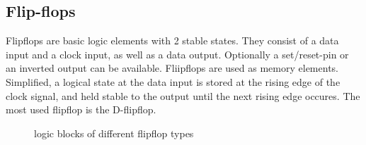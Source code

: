 \subsection{Flip-flops}
\label{ch:flipflops}
Flipflops are basic logic elements with 2 stable states. They consist of a data input and a clock input, as well as a data output. Optionally a set/reset-pin or an inverted output can be available. Fliipflops are used as memory elements. Simplified, a logical state at the data input is stored at the rising edge of the clock signal, and held stable to the output until the next rising edge occures. The most used flipflop is the D-flipflop.
\begin{figure}
\begin{center}
\caption{logic blocks of different flipflop types}
\end{center}
\end{figure}

